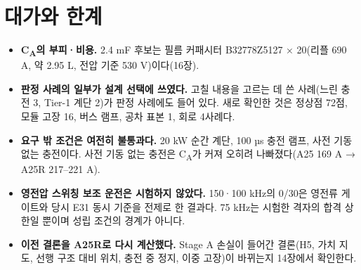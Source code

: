 \section{대가와 한계}

\begin{itemize}
\item \textbf{C\textsubscript{A}의 부피·비용.} 2.4 mF 후보는 필름 커패시터 B32778Z5127 × 20(리플 690 A, 약 2.95 L, 전압 기준 530 V)이다(16장).
\item \textbf{판정 사례의 일부가 설계 선택에 쓰였다.} 고칠 내용을 고르는 데 쓴 사례(느린 충전 3, Tier-1 계단 2)가 판정 사례에도 들어 있다. 새로 확인한 것은 정상점 72점, 모듈 고장 16, 버스 램프, 공차 표본 1, 회로 4사례다.
\item \textbf{요구 밖 조건은 여전히 불통과다.} 20 kW 순간 계단, 100 µs 충전 램프, 사전 기동 없는 충전이다. 사전 기동 없는 충전은 C\textsubscript{A}가 커져 오히려 나빠졌다(A25 169 A → A25R 217–221 A).
\item \textbf{영전압 스위칭 보조 운전은 시험하지 않았다.} 150·100 kHz의 0/30은 영전류 게이트와 당시 E31 동시 기준을 전제로 한 결과다. 75 kHz는 시험한 격자의 합격 상한일 뿐이며 성립 조건의 경계가 아니다.
\item \textbf{이전 결론을 A25R로 다시 계산했다.} Stage A 손실이 들어간 결론(H5, 가치 지도, 선행 구조 대비 위치, 충전 중 정지, 이중 고장)이 바뀌는지 14장에서 확인한다.
\end{itemize}
